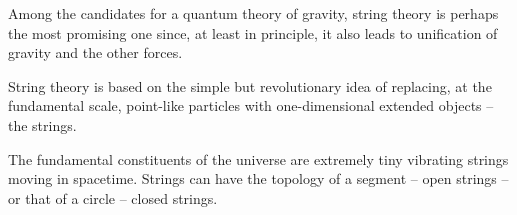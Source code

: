 \documentclass[draft]{phd}
\begin{document}
Among the candidates 
for a quantum theory of gravity, string theory is perhaps the most promising one since, at least in principle, it also leads to unification of gravity and the other forces.

String theory is based on the simple but revolutionary idea of replacing, at the fundamental scale, point-like particles with one-dimensional extended objects -- the strings.
		
				\begin{figure}[h]
					\centering
				\end{figure}
The fundamental constituents of the universe are extremely tiny vibrating strings moving in spacetime. Strings can have the topology of a segment -- open strings -- 
 or that of a circle -- closed strings.
%	
	
\end{document}

